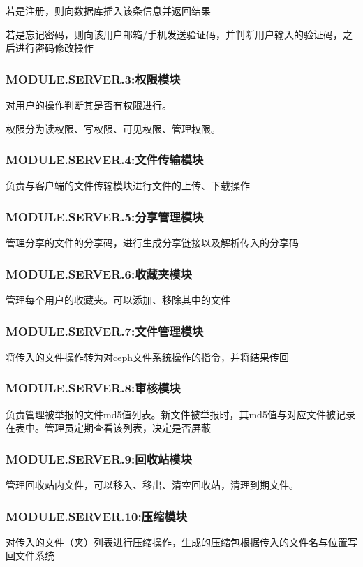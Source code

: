 若是注册，则向数据库插入该条信息并返回结果

若是忘记密码，则向该用户邮箱/手机发送验证码，并判断用户输入的验证码，之后进行密码修改操作

\subsubsection{MODULE.SERVER.3:权限模块}
对用户的操作判断其是否有权限进行。

权限分为读权限、写权限、可见权限、管理权限。

\subsubsection{MODULE.SERVER.4:文件传输模块}
负责与客户端的文件传输模块进行文件的上传、下载操作

\subsubsection{MODULE.SERVER.5:分享管理模块}
管理分享的文件的分享码，进行生成分享链接以及解析传入的分享码

\subsubsection{MODULE.SERVER.6:收藏夹模块}
管理每个用户的收藏夹。可以添加、移除其中的文件

\subsubsection{MODULE.SERVER.7:文件管理模块}

将传入的文件操作转为对ceph文件系统操作的指令，并将结果传回

\subsubsection{MODULE.SERVER.8:审核模块} 
负责管理被举报的文件md5值列表。新文件被举报时，其md5值与对应文件被记录在表中。管理员定期查看该列表，决定是否屏蔽

\subsubsection{MODULE.SERVER.9:回收站模块}
管理回收站内文件，可以移入、移出、清空回收站，清理到期文件。

\subsubsection{MODULE.SERVER.10:压缩模块}
对传入的文件（夹）列表进行压缩操作，生成的压缩包根据传入的文件名与位置写回文件系统

